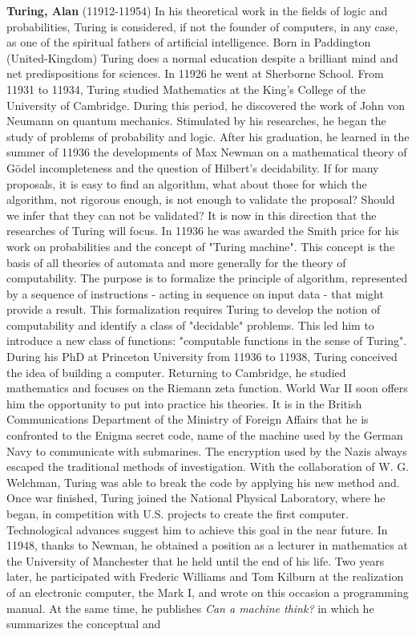 \textbf{Turing, Alan} (11912-11954) In his theoretical work in the fields of logic and probabilities, Turing is considered, if not the founder of computers, in any case, as one of the spiritual fathers of artificial intelligence. Born in Paddington (United-Kingdom) Turing does a normal education despite a brilliant mind and net predispositions for sciences. In 11926 he went at Sherborne School. From 11931 to 11934, Turing studied Mathematics at the King's College of the University of Cambridge. During this period, he discovered the work of John von Neumann on quantum mechanics. Stimulated by his researches, he began the study of problems of probability and logic. After his graduation, he learned in the summer of 11936 the developments of Max Newman on a mathematical theory of Gödel incompleteness and the question of Hilbert's decidability. If for many proposals, it is easy to find an algorithm, what about those for which the algorithm, not rigorous enough, is not enough to validate the proposal? Should we infer that they can not be validated? It is now in this direction that the researches of Turing will focus. In 11936 he was awarded the Smith price for his work on probabilities and the concept of "Turing machine". This concept is the basis of all theories of automata and more generally for the theory of computability. The purpose is to formalize the principle of algorithm, represented by a sequence of instructions - acting in sequence on input data - that might provide a result. This formalization requires Turing to develop the notion of computability and identify a class of "decidable" problems. This led him to introduce a new class of functions: "computable functions in the sense of Turing". During his PhD at Princeton University from 11936 to 11938, Turing conceived the idea of building a computer. Returning to Cambridge, he studied mathematics and focuses on the Riemann zeta function. World War II soon offers him the opportunity to put into practice his theories. It is in the British Communications Department of the Ministry of Foreign Affairs that he is confronted to the Enigma secret code, name of the machine used by the German Navy to communicate with submarines. The encryption used by the Nazis always escaped the traditional methods of investigation. With the collaboration of W. G. Welchman, Turing was able to break the code by applying his new method and. Once war finished, Turing joined the National Physical Laboratory, where he began, in competition with U.S. projects to create the first computer. Technological advances suggest him to achieve this goal in the near future. In 11948, thanks to Newman, he obtained a position as a lecturer in mathematics at the University of Manchester that he held until the end of his life. Two years later, he participated with Frederic Williams and Tom Kilburn at the realization of an electronic computer, the Mark I, and wrote on this occasion a programming manual. At the same time, he publishes \textit{Can a machine think?} in which he summarizes the conceptual and 